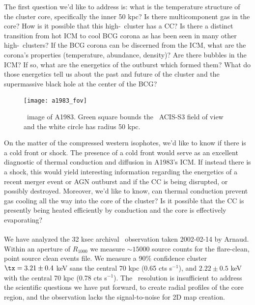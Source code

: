 \documentclass[letterpaper,11pt,twocolumn]{article}
\begin{document}
The first question we'd like to address is: what is the temperature
structure of the cluster core, specifically the inner 50 kpc? Is there
multicomponent gas in the core? How is it possible that this
high-\kna\ cluster has a CC? Is there a distinct transition from hot
ICM to cool BCG corona as has been seen in many other
high-\kna\ clusters? If the BCG corona can be discerned from the ICM,
what are the corona's properties (temperature, abundance, density)?
Are there bubbles in the ICM? If so, what are the energetics of the
outburst which formed them? What do those energetics tell us about the
past and future of the cluster and the supermassive black hole at the
center of the BCG? 
\begin{figure}[ht]
  \begin{center}
    \texttt{[image: a1983\_fov]}
    \caption{\xmm\ image of A1983. Green square bounds the
      \chandra\ ACIS-S3 field of view and the white circle has radius 50
      kpc.}
    \vspace{-22pt}
    \label{fig:a1983}
  \end{center}
\end{figure}

On the matter of the compressed western isophotes, we'd like to know
if there is a cold front or shock. The presence of a cold front would
serve as an excellent diagnostic of thermal conduction and diffusion
in A1983's ICM. If instead there is a shock, this would yield
interesting information regarding the energetics of a recent merger
event or AGN outburst and if the CC is being disrupted, or possibly
destroyed. Moreover, we'd like to know, can thermal conduction prevent
gas cooling all the way into the core of the cluster?  Is it possible
that the CC is presently being heated efficiently by conduction and
the core is effectively evaporating?\\

\\
We have analyzed the 32 ksec archival \xmm\ observation taken
2002-02-14 by Arnaud. Within an aperture of $R_{1000}$ we measure
$\sim 15000$ source counts for the flare-clean, point source clean
events file. We measure a 90\% confidence cluster $\tx = 3.21 \pm 0.4$
keV sans the central 70 kpc (0.65 cts s$^{-1}$), and $2.22 \pm 0.5$
keV with the central 70 kpc (0.78 cts s$^{-1}$). The \xmm\ resolution
is insufficient to address the scientific questions we have put
forward, to create radial profiles of the core region, and the
observation lacks the signal-to-noise for 2D map creation.\\
\end{document}
